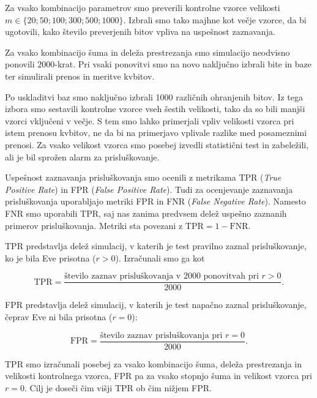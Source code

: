     Za vsako kombinacijo parametrov smo preverili
    kontrolne vzorce velikosti
    $m \in \{20; 50; 100; 300; 500; 1000\}$.
    Izbrali smo tako majhne kot večje vzorce,
    da bi ugotovili, kako število preverjenih
    bitov vpliva na uspešnost zaznavanja.

Za vsako kombinacijo šuma in deleža prestrezanja
smo simulacijo neodvisno ponovili 2000-krat.
Pri vsaki ponovitvi smo na novo naključno
izbrali bite in baze ter simulirali prenos
in meritve kvbitov.

Po uskladitvi baz smo naključno izbrali
1000 različnih ohranjenih bitov. Iz tega
izbora smo sestavili kontrolne vzorce vseh
šestih velikosti, tako da so bili manjši
vzorci vključeni v večje. S tem smo lahko
primerjali vpliv velikosti vzorca pri istem
prenosu kvbitov, ne da bi na primerjavo
vplivale razlike med posameznimi prenosi.
Za vsako velikost vzorca smo posebej izvedli
statistični test in zabeležili, ali je bil
sprožen alarm za prisluškovanje.


    

Uspešnost zaznavanja prisluškovanja smo ocenili
z metrikama TPR (\textit{True Positive Rate})
in FPR (\textit{False Positive Rate}).
Tudi \citet{g22:lee2023detection} za ocenjevanje
zaznavanja prisluškovanja uporabljajo metriki
FPR in FNR (\textit{False Negative Rate}).
Namesto FNR smo uporabili TPR, saj nas zanima
predvsem delež uspešno zaznanih primerov
prisluškovanja. Metriki sta povezani z
$\mathrm{TPR}=1-\mathrm{FNR}$.


TPR predstavlja delež simulacij, v katerih
je test pravilno zaznal prisluškovanje,
ko je bila Eve prisotna ($r>0$).
Izračunali smo ga kot

\begin{equation}
    \mathrm{TPR} =
    \frac{\text{število zaznav prisluškovanja v 2000 ponovitvah pri } r>0}{2000}.
    \label{g22:eq:tpr}
\end{equation}

FPR predstavlja delež simulacij, v katerih
je test napačno zaznal prisluškovanje,
čeprav Eve ni bila prisotna ($r=0$):

\begin{equation}
    \mathrm{FPR} =
    \frac{\text{število zaznav prisluškovanja pri } r=0}{2000}.
    \label{g22:eq:fpr}
\end{equation}

TPR smo izračunali posebej za vsako kombinacijo
šuma, deleža prestrezanja in velikosti kontrolnega
vzorca, FPR pa za vsako stopnjo šuma in velikost
vzorca pri $r=0$. Cilj je doseči čim višji TPR
ob čim nižjem FPR.


